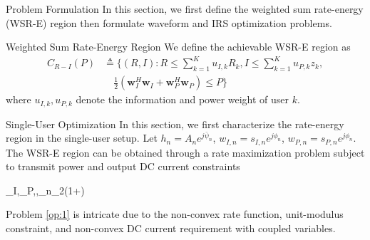 \documentclass{IEEEtran}
\begin{document}
\begin{section}{Problem Formulation}
	In this section, we first define the weighted sum rate-energy (WSR-E) region then formulate waveform and IRS optimization problems.
	\begin{subsection}{Weighted Sum Rate-Energy Region}
		We define the achievable WSR-E region as
		\begin{equation}
			\begin{split}
				C_{R-I}(P)
				&\triangleq \biggl\{(R,I):R\le\sum_{k=1}^K{u_{I,k}R_k},I\le\sum_{k=1}^K u_{P,k}z_k,\\
				&\quad \frac{1}{2}({\boldsymbol{w}_I^H}{\boldsymbol{w}_I}+{\boldsymbol{w}_P^H}{\boldsymbol{w}_P}){\le}P\biggr\}
			\end{split}
		\end{equation}
		where $u_{I,k},u_{P,k}$ denote the information and power weight of user $k$.
	\end{subsection}

	\begin{subsection}{Single-User Optimization}
		In this section, we first characterize the rate-energy region in the single-user setup. Let $h_n={A_n}{e^{j{\bar{\psi}_n}}}$, $w_{I,n}=s_{I,n}e^{j{\phi}_n}$, $w_{P,n}=s_{P,n}e^{j{\phi}_n}$. The WSR-E region can be obtained through a rate maximization problem subject to transmit power and output DC current constraints
		\begin{maxi}
			{\boldsymbol{w}_I,_P,,\rho}{\sum_{n}{\log_2\left(1+\right)}}{\label{op:1}}{}
		\end{maxi}
		Problem \ref{op:1} is intricate due to the non-convex rate function, unit-modulus constraint, and non-convex DC current requirement with coupled variables.


\end{subsection}
\end{section}
\end{document}

